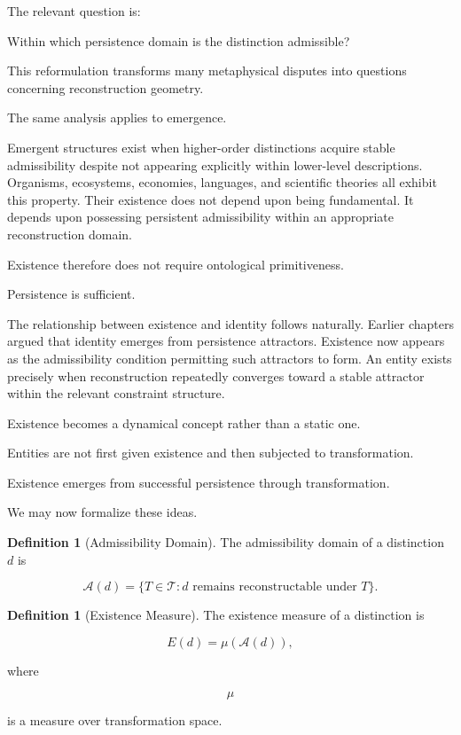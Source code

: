 \documentclass[12pt,oneside]{article}
\theoremstyle{definition}
\newtheorem{definition}[theorem]{Definition} \newtheorem{axiom}[theorem]{Axiom} \newtheorem{remark}[theorem]{Remark} \newtheorem{example}[theorem]{Example}
\begin{document}
The relevant question is:

Within which persistence domain is the distinction admissible?

This reformulation transforms many metaphysical disputes into questions concerning reconstruction geometry.

The same analysis applies to emergence.

Emergent structures exist when higher-order distinctions acquire stable admissibility despite not appearing explicitly within lower-level descriptions. Organisms, ecosystems, economies, languages, and scientific theories all exhibit this property. Their existence does not depend upon being fundamental. It depends upon possessing persistent admissibility within an appropriate reconstruction domain.

Existence therefore does not require ontological primitiveness.

Persistence is sufficient.

The relationship between existence and identity follows naturally. Earlier chapters argued that identity emerges from persistence attractors. Existence now appears as the admissibility condition permitting such attractors to form. An entity exists precisely when reconstruction repeatedly converges toward a stable attractor within the relevant constraint structure.

Existence becomes a dynamical concept rather than a static one.

Entities are not first given existence and then subjected to transformation.

Existence emerges from successful persistence through transformation.

We may now formalize these ideas.

\begin{definition}[Admissibility Domain]

The admissibility domain of a distinction \(d\) is

\[
\mathcal A(d)
=
\{
T\in\mathcal T
:
d \text{ remains reconstructable under } T
\}.
\]

\end{definition}

\begin{definition}[Existence Measure]

The existence measure of a distinction is

\[
E(d)
=
\mu(\mathcal A(d)),
\]

where

\[
\mu
\]

is a measure over transformation space.

\end{definition}
\end{document}
